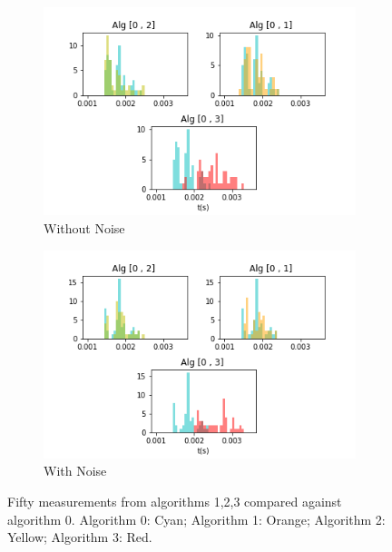 \documentclass[conference]{IEEEtran}
\begin{document}
\begin{figure}
	\centering
	\begin{subfigure}[b]{0.5\textwidth}
		\includegraphics[width=1\linewidth]{fig/f_noise}
		\caption{Without Noise}
		\label{fig:Ng1}
	\end{subfigure}

	\begin{subfigure}[b]{0.5\textwidth}
		\includegraphics[width=1\linewidth]{fig/f}
		\caption{With Noise}
		\label{fig:Ng2} 
	\end{subfigure}
\caption{Fifty measurements from algorithms 1,2,3 compared against algorithm 0.  Algorithm 0: Cyan;  Algorithm 1: Orange; Algorithm 2: Yellow; Algorithm 3: Red.}
\label{fig:d}
\end{figure}
\end{document}
